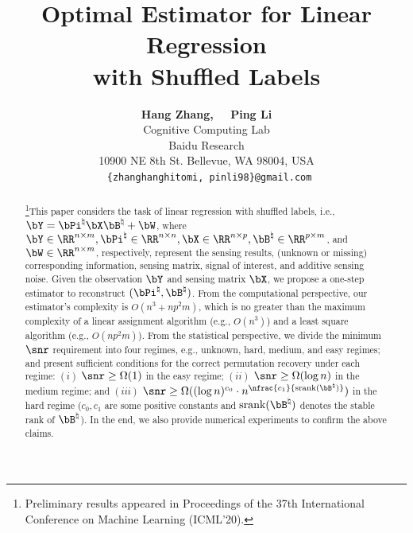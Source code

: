 \documentclass[11pt]{article}
\def \bPitrue {\bPi^{\natural}}
\def \bBtrue {\bB^{\natural}}
\def\srank#1{\textup{srank}(#1)}
\begin{document}
\title{\bf Optimal Estimator for Linear Regression \\ with Shuffled Labels\vspace{0.3in}}


\author{
  \textbf{Hang Zhang, \ \  Ping Li} \vspace{0.1in}\\
  Cognitive Computing Lab\\
  Baidu Research\\
  10900 NE 8th St. Bellevue, WA 98004, USA\\
  \texttt{ \{zhanghanghitomi,\ pinli98\}@gmail.com}
}
\date{\vspace{0.1in}}
\maketitle

\begin{abstract}
\noindent\footnote{Preliminary results appeared in Proceedings of the 37th International Conference on Machine Learning (ICML'20).}This paper considers the task of linear regression with shuffled labels, i.e.,
$\bY = \bPitrue \bX \bBtrue + \bW$, where $\bY \in \RR^{n\times m}, \bPitrue \in \RR^{n\times n}, \bX\in \RR^{n\times p}, \bBtrue \in \RR^{p\times m}$,
and $\bW\in \RR^{n\times m}$, respectively, represent the
sensing results, (unknown or missing) corresponding information, sensing matrix, signal of interest, and additive sensing noise.
Given the observation $\bY$ and sensing matrix $\bX$, we propose
a one-step estimator to reconstruct $(\bPitrue, \bBtrue)$.
From the computational perspective, our estimator's complexity
is $O(n^3 + np^2m)$, which is no greater than the maximum complexity of a
linear assignment algorithm (e.g., $O(n^3)$) and a least square algorithm (e.g., $O(np^2 m)$).
From the statistical perspective, we divide the minimum
$\snr$ requirement into four regimes, e.g.,
unknown, hard, medium, and easy regimes; and
present sufficient conditions for the correct permutation
recovery under each regime:
$(i)$ $\snr \geq \Omega(1)$ in the easy regime;
$(ii)$ $\snr \geq \Omega(\log n)$ in the medium regime;
and $(iii)$ $\snr \geq \Omega((\log n)^{c_0}\cdot n^{\nfrac{c_1}{\srank{\bBtrue}}})$ in the hard regime ($c_0, c_1$ are some positive constants and $\srank{\bBtrue}$ denotes the stable rank of $\bBtrue$).
In the end, we also provide numerical experiments to confirm
the above claims.

\end{abstract}
\end{document}
